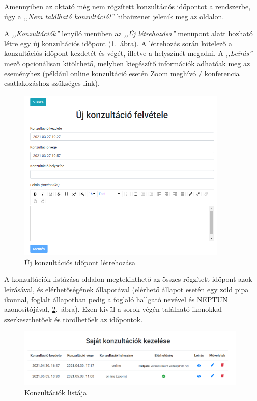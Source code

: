 \documentclass[
]{thesis-ekf}
\theoremstyle{definition}
\theoremstyle{remark}
\begin{document}
	Amennyiben az oktató még nem rögzített konzultációs időpontot a rendszerbe, úgy a \emph{,,Nem található konzultáció!''} hibaüzenet jelenik meg az oldalon.
	
	A \emph{,,Konzultációk''} lenyíló menüben az \emph{,,Új létrehozása''} menüpont alatt hozható létre egy új konzultációs időpont  (\ref{fig:oktato_konzultacio_letrehozas}.~ábra). A létrehozás során kötelező a konzultációs időpont kezdetét és végét, illetve a helyszínét megadni. A \emph{,,Leírás''} mező opcionálisan kitölthető, melyben kiegészítő információk adhatóak meg az eseményhez (például online konzultáció esetén Zoom meghívó / konferencia csatlakozáshoz szükséges link).
	
	\begin{figure}[!h]
		\centering
		\includegraphics[width=10cm]{kepek/screenshots/oktato_konzultacio_letrehozas.png}
		\caption{Új konzultációs időpont létrehozása}
		\label{fig:oktato_konzultacio_letrehozas}
	\end{figure}
	
	A konzultációk listázása oldalon megtekinthető az összes rögzített időpont azok leírásával, és elérhetőségének állapotával (elérhető állapot esetén egy zöld pipa ikonnal, foglalt állapotban pedig a foglaló hallgató nevével és NEPTUN azonosítójával, \ref{fig:oktato_konzultacio_lista}.~ábra). Ezen kívül a sorok végén található ikonokkal szerkeszthetőek és törölhetőek az időpontok.
	
	\begin{figure}[!h]
		\centering
		\includegraphics[width=11cm]{kepek/screenshots/oktato_konzultacio_tablazat_tobb.png}
		\caption{Konzultációk listája}
		\label{fig:oktato_konzultacio_lista}
	\end{figure}
	
\end{document}
